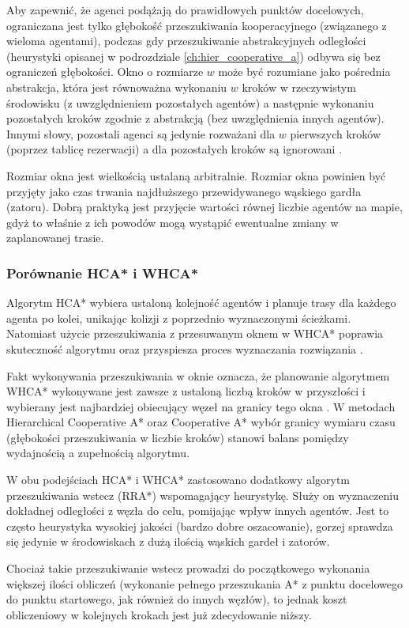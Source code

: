 Aby zapewnić, że agenci podążają do prawidłowych punktów docelowych, ograniczana jest tylko głębokość przeszukiwania kooperacyjnego (związanego z wieloma agentami), podczas gdy przeszukiwanie abstrakcyjnych odległości (heurystyki opisanej w podrozdziale \ref{ch:hier_cooperative_a}) odbywa się bez ograniczeń głębokości. Okno o rozmiarze $w$ może być rozumiane jako pośrednia abstrakcja, która jest równoważna wykonaniu $w$ kroków w rzeczywistym środowisku (z uwzględnieniem pozostałych agentów) a następnie wykonaniu pozostałych kroków zgodnie z abstrakcją (bez uwzględnienia innych agentów). Innymi słowy, pozostali agenci są jedynie rozważani dla $w$ pierwszych kroków (poprzez tablicę rezerwacji) a dla pozostałych kroków są ignorowani \cite{cooppath}.

Rozmiar okna jest wielkością ustalaną arbitralnie. Rozmiar okna powinien być przyjęty jako czas trwania najdłuższego przewidywanego wąskiego gardła (zatoru).
Dobrą praktyką jest przyjęcie wartości równej liczbie agentów na mapie, gdyż to właśnie z ich powodów mogą wystąpić ewentualne zmiany w zaplanowanej trasie.

\subsubsection{Porównanie HCA* i WHCA*}
Algorytm HCA* wybiera ustaloną kolejność agentów i planuje trasy dla każdego agenta po kolei, unikając kolizji z poprzednio wyznaczonymi ścieżkami. 
Natomiast użycie przeszukiwania z przesuwanym oknem w WHCA* poprawia skuteczność algorytmu oraz przyspiesza proces wyznaczania rozwiązania \cite{completealgo_standley}.

Fakt wykonywania przeszukiwania w oknie oznacza, że planowanie algorytmem WHCA* wykonywane jest zawsze z ustaloną liczbą kroków w przyszłości i wybierany jest najbardziej obiecujący węzeł na granicy tego okna \cite{rtcooppathfinding}. W metodach Hierarchical Cooperative A* oraz Cooperative A* wybór granicy wymiaru czasu (głębokości przeszukiwania w liczbie kroków) stanowi balans pomiędzy wydajnością a zupełnością algorytmu.

W obu podejściach HCA* i WHCA* zastosowano dodatkowy algorytm przeszukiwania wstecz (RRA*) wspomagający heurystykę. Służy on wyznaczeniu dokładnej odległości z węzła do celu, pomijając wpływ innych agentów. Jest to często heurystyka wysokiej jakości (bardzo dobre oszacowanie), gorzej sprawdza się jedynie w środowiskach z dużą ilością wąskich gardeł i zatorów. \cite{rtcooppathfinding}

Chociaż takie przeszukiwanie wstecz prowadzi do początkowego wykonania większej ilości obliczeń (wykonanie pełnego przeszukania A* z punktu docelowego do punktu startowego, jak również do innych węzłów), to jednak koszt obliczeniowy w kolejnych krokach jest już zdecydowanie niższy. \cite{rtcooppathfinding}
